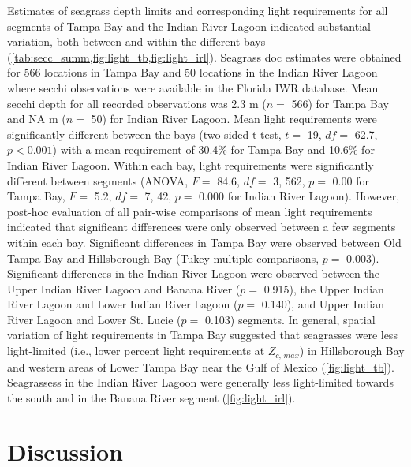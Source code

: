 \documentclass[letterpaper,12pt,oneside]{article}\usepackage[]{graphicx}\usepackage[]{color}
\begin{document}
Estimates of seagrass depth limits and corresponding light requirements for all segments of Tampa Bay and the Indian River Lagoon indicated substantial variation, both between and within the different bays (\cref{tab:secc_summ,fig:light_tb,fig:light_irl}).  Seagrass \ac{doc} estimates were obtained for 566 locations in Tampa Bay and 50 locations in the Indian River Lagoon where secchi observations were available in the Florida \ac{IWR} database.  Mean secchi depth for all recorded observations was 2.3 m ($n=$ 566) for Tampa Bay and NA m ($n=$ 50) for Indian River Lagoon.  Mean light requirements were significantly different between the bays (two-sided t-test, $t=$ 19, $df=$ 62.7, $p < 0.001$) with a mean requirement of 30.4\% for Tampa Bay and 10.6\% for Indian River Lagoon.  Within each bay, light requirements were significantly different between segments (ANOVA, $F =$ 84.6, $df =$ 3, 562, $p = $ 0.00 for Tampa Bay, $F =$ 5.2, $df =$ 7, 42, $p = $ 0.000 for Indian River Lagoon).  However, post-hoc evaluation of all pair-wise comparisons of mean light requirements indicated that significant differences were only observed between a few segments within each bay.  Significant differences in Tampa Bay were observed between Old Tampa Bay and Hillsborough Bay (Tukey multiple comparisons, $p =$ 0.003).  Significant differences in the Indian River Lagoon were observed between the Upper Indian River Lagoon and Banana River ($p =$ 0.915), the Upper Indian River Lagoon and Lower Indian River Lagoon ($p =$ 0.140), and Upper Indian River Lagoon and Lower St. Lucie ($p =$ 0.103) segments.  In general, spatial variation of light requirements in Tampa Bay suggested that seagrasses were less light-limited (i.e., lower percent light requirements at $Z_{c,\,max}$) in Hillsborough Bay and western areas of Lower Tampa Bay near the Gulf of Mexico (\cref{fig:light_tb}).  Seagrassess in the Indian River Lagoon were generally less light-limited towards the south and in the Banana River segment (\cref{fig:light_irl}).

\section{Discussion}



\end{document}
